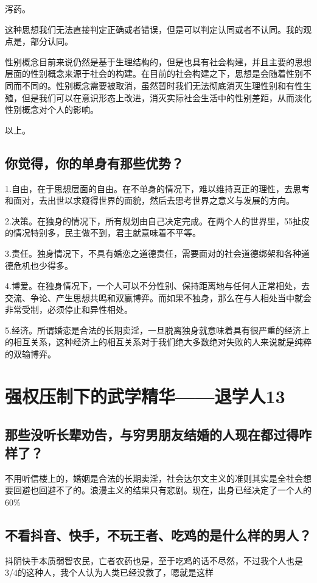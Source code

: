 \documentclass{ctexart}
\begin{document}
	泻药。
	
	这种思想我们无法直接判定正确或者错误，但是可以判定认同或者不认同。我的观点是，部分认同。
	
	性别概念目前来说仍然是基于生理结构的，但是也具有社会构建，并且主要的思想层面的性别概念来源于社会的构建。在目前的社会构建之下，思想是会随着性别不同而不同的。性别概念需要被取消，虽然暂时我们无法彻底消灭生理性别和有性生殖，但是我们可以在意识形态上改进，消灭实际社会生活中的性别差距，从而淡化性别概念对个人的影响。
	
	以上。
	
	
	\subsection{你觉得，你的单身有那些优势？}
	
	1.自由，在于思想层面的自由。在不单身的情况下，难以维持真正的理性，去思考和面对，去出世以求窥得世界的面貌，然后去思考世界之意义与发展的方向。
	
	2.决策。在独身的情况下，所有规划由自己决定完成。在两个人的世界里，55扯皮的情况特别多，民主做不到，君主就意味着不平等。
	
	3.责任。独身情况下，不具有婚恋之道德责任，需要面对的社会道德绑架和各种道德危机也少得多。
	
	4.博爱。在独身情况下，一个人可以不分性别、保持距离地与任何人正常相处，去交流、争论、产生思想共鸣和双赢博弈。而如果不独身，那么在与人相处当中就会非常受制，必须停止和异性相处。
	
	5.经济。所谓婚恋是合法的长期卖淫，一旦脱离独身就意味着具有很严重的经济上的相互关系，这种经济上的相互关系对于我们绝大多数绝对失败的人来说就是纯粹的双输博弈。
	
	\section{强权压制下的武学精华——退学人13}
		\subsection{那些没听长辈劝告，与穷男朋友结婚的人现在都过得咋样了？}
			不用听信楼上的，婚姻是合法的长期卖淫，社会达尔文主义的准则其实是全社会想要回避也回避不了的。浪漫主义的结果只有悲剧。现在，出身已经决定了一个人的60\%

		\subsection{不看抖音、快手，不玩王者、吃鸡的是什么样的男人？}
			抖阴快手本质弱智农民，亡者农药也是，至于吃鸡的话不尽然，不过我个人也是3/4的这种人，我个人认为人类已经没救了，嗯就是这样
\end{document}
